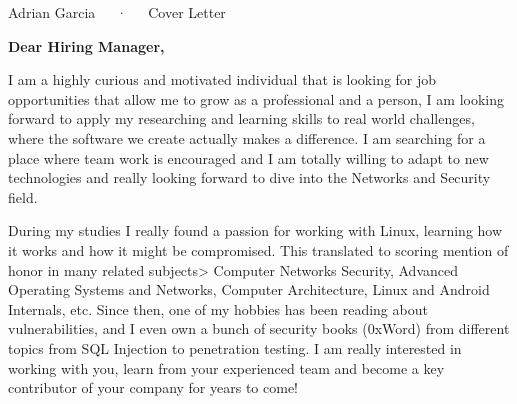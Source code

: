 \documentclass[11pt, a4paper]{awesome-cv}
\begin{document}
\makecvheader[R]

\makecvfooter
  {}
  {Adrian Garcia~~~·~~~Cover Letter}
  {}

\begin{cvletter}

\textbf{Dear Hiring Manager,}

I am a highly curious and motivated individual that is looking for job opportunities that allow me to grow as a professional and a person, I am looking forward to apply my researching and learning skills to real world challenges, where the software we create actually makes a difference. I am searching for a place where team work is encouraged and I am totally willing to adapt to new technologies and really looking forward to dive into the Networks and Security field.

During my studies I really found a passion for working with Linux, learning how it works and how it might be compromised. This translated to scoring mention of honor in many related subjects> Computer Networks Security, Advanced Operating Systems and Networks, Computer Architecture, Linux and Android Internals, etc. Since then, one of my hobbies has been reading about vulnerabilities, and I even own a bunch of security books (0xWord) from different topics from SQL Injection to penetration testing. I am really interested in working with you, learn from your experienced team and become a key contributor of your company for years to come!


\end{cvletter}


\makeletterclosing
\end{document}
